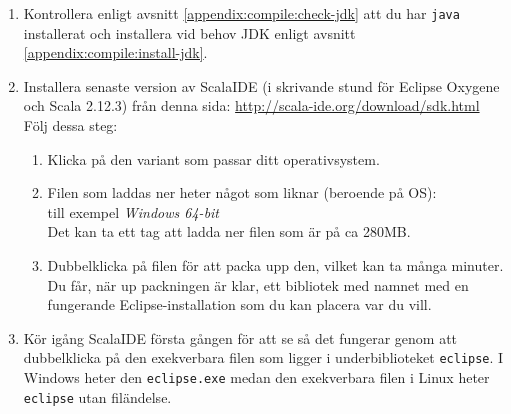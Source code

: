 \begin{enumerate}
\item Kontrollera enligt avsnitt \ref{appendix:compile:check-jdk} att du har \texttt{java} installerat och installera vid behov JDK enligt avsnitt \ref{appendix:compile:install-jdk}.

\item Installera senaste version av ScalaIDE (i skrivande stund \ScalaVersion för Eclipse Oxygene och Scala 2.12.3) från denna sida:  \url{http://scala-ide.org/download/sdk.html} \\
Följ dessa steg:
\begin{enumerate}
\item Klicka på den variant som passar ditt operativsystem.
\item Filen som laddas ner heter något som liknar (beroende på OS): \\ till exempel  \emph{Windows 64-bit}
\\ Det kan ta ett tag att ladda ner filen som är på ca 280MB.

\item Dubbelklicka på filen för att packa upp den, vilket kan ta många minuter. Du får, när up	packningen är klar, ett bibliotek med namnet  med en fungerande Eclipse-installation som du kan placera var du vill.
\end{enumerate}

\item Kör igång ScalaIDE första gången för att se så det fungerar genom att dubbelklicka på den exekverbara filen som ligger i underbiblioteket \texttt{eclipse}. I Windows heter den \texttt{eclipse.exe} medan den exekverbara filen i Linux heter \texttt{eclipse} utan filändelse.


\end{enumerate}
